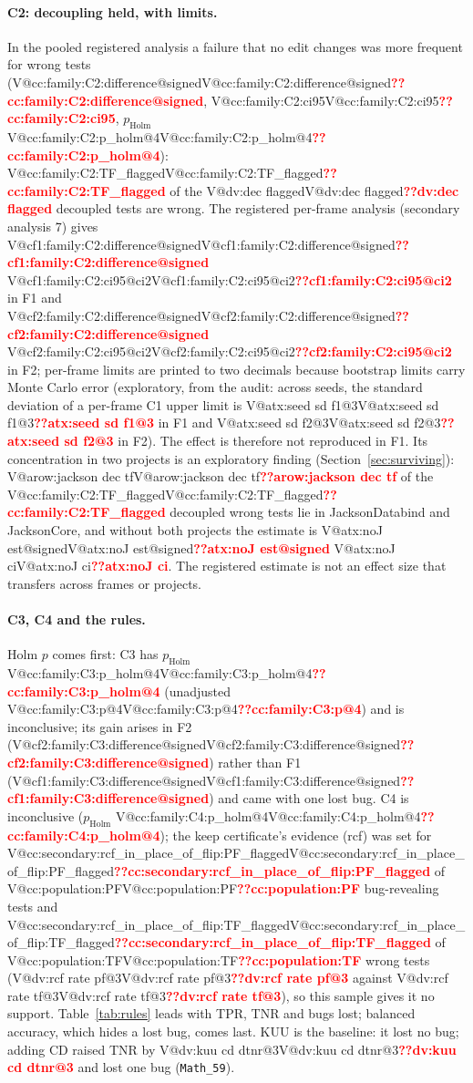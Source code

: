 \documentclass[pdflatex,iicol,sn-mathphys-num]{sn-jnl}
\makeatletter
\newcommand{\V}[1]{\ifcsname V@#1\endcsname\csname V@#1\endcsname\else\textbf{\textcolor{red}{??#1}}\fi}
\makeatother
\begin{document}
\paragraph{C2: decoupling held, with limits.} In the pooled registered analysis a failure that no edit changes was more frequent for wrong tests (\V{cc:family:C2:difference@signed}, \V{cc:family:C2:ci95}, $p_\mathrm{Holm}$ \V{cc:family:C2:p_holm@4}): \V{cc:family:C2:TF_flagged} of the \V{dv:dec flagged} decoupled tests are wrong. The registered per-frame analysis (secondary analysis 7) gives \V{cf1:family:C2:difference@signed} \V{cf1:family:C2:ci95@ci2} in F1 and \V{cf2:family:C2:difference@signed} \V{cf2:family:C2:ci95@ci2} in F2; per-frame limits are printed to two decimals because bootstrap limits carry Monte Carlo error (exploratory, from the audit: across seeds, the standard deviation of a per-frame C1 upper limit is \V{atx:seed sd f1@3} in F1 and \V{atx:seed sd f2@3} in F2). The effect is therefore not reproduced in F1. Its concentration in two projects is an exploratory finding (Section~\ref{sec:surviving}): \V{arow:jackson dec tf} of the \V{cc:family:C2:TF_flagged} decoupled wrong tests lie in JacksonDatabind and JacksonCore, and without both projects the estimate is \V{atx:noJ est@signed} \V{atx:noJ ci}. The registered estimate is not an effect size that transfers across frames or projects.

\paragraph{C3, C4 and the rules.} Holm $p$ comes first: C3 has $p_\mathrm{Holm}$ \V{cc:family:C3:p_holm@4} (unadjusted \V{cc:family:C3:p@4}) and is inconclusive; its gain arises in F2 (\V{cf2:family:C3:difference@signed}) rather than F1 (\V{cf1:family:C3:difference@signed}) and came with one lost bug. C4 is inconclusive ($p_\mathrm{Holm}$ \V{cc:family:C4:p_holm@4}); the keep certificate's evidence (rcf) was set for \V{cc:secondary:rcf_in_place_of_flip:PF_flagged} of \V{cc:population:PF} bug-revealing tests and \V{cc:secondary:rcf_in_place_of_flip:TF_flagged} of \V{cc:population:TF} wrong tests (\V{dv:rcf rate pf@3} against \V{dv:rcf rate tf@3}), so this sample gives it no support. Table~\ref{tab:rules} leads with TPR, TNR and bugs lost; balanced accuracy, which hides a lost bug, comes last. KUU is the baseline: it lost no bug; adding CD raised TNR by \V{dv:kuu cd dtnr@3} and lost one bug (\texttt{Math\_59}).
\end{document}
